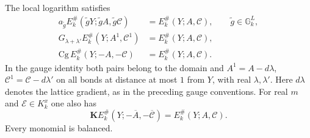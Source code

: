 \begin{proposition}\label{prop:rgnl-symmetries}
The local logarithm satisfies
\begin{align}
 a_{\tilde g}E_k^\#(\tilde gY;\tilde gA,\tilde g\mathscr C)
          &=E_k^\#(Y;A,\mathscr C),\qquad \tilde g\in\mathbb G_k^L,
                                      \label{eq:rgnl-lattice-symmetry}\\
 G_{\lambda+\lambda'}E_k^\#(Y;A^1,\mathscr C^1)
          &=E_k^\#(Y;A,\mathscr C),    \label{eq:rgnl-gauge-symmetry}\\
 \mathrm{Cg}\,E_k^\#(Y;-A,-\mathscr C)
          &=E_k^\#(Y;A,\mathscr C).    \label{eq:rgnl-charge-symmetry}
\end{align}
In the gauge identity both pairs belong to the domain and
 $A^1=A-d\lambda$, $\mathscr C^1=\mathscr C-d\lambda'$
on all bonds at distance at most $1$ from $Y$, with
real $\lambda,\lambda'$. Here $d\lambda$ denotes the
lattice gradient, as in the preceding gauge conventions.
For real $m$ and $\mathscr E\in K_k^x$ one also has
\begin{equation}\label{eq:rgnl-reality-symmetry}
 \mathbf K E_k^\#(Y;-\overline A,-\overline{\mathscr C})
                                        =E_k^\#(Y;A,\mathscr C).
\end{equation}
Every monomial is balanced.
\end{proposition}

